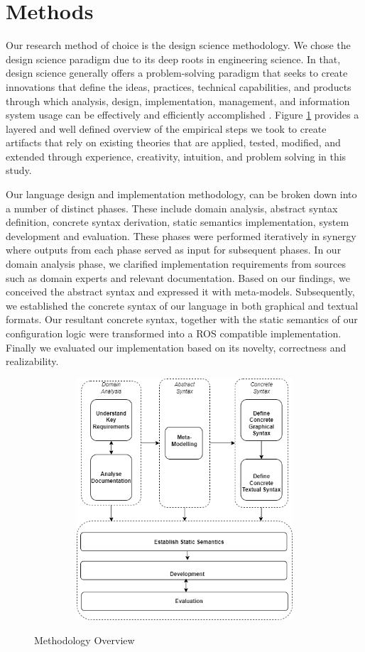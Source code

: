 \documentclass[conference]{IEEEtran}
\begin{document}
\section{Methods}
Our research method of choice is the design science methodology. We chose the design science paradigm due to its deep roots in engineering science. In that, design science generally offers a problem-solving paradigm that seeks to create innovations that define the ideas, practices, technical capabilities, and products through which analysis, design, implementation, management, and information system usage can be effectively and efficiently accomplished  \cite{des-res}. Figure \ref{methover} provides a layered and well defined overview of the empirical steps we took to create artifacts that rely on existing theories that are applied, tested, modified, and extended through experience, creativity, intuition, and problem solving in this study.

Our language design and implementation methodology, can be broken down into a number of distinct phases. These include domain analysis, abstract syntax definition, concrete syntax derivation, static semantics implementation, system development and evaluation. These phases were performed iteratively in synergy where outputs from each phase served as input for subsequent phases. In our domain analysis phase, we clarified implementation requirements from sources such as domain experts and relevant documentation. Based on our findings, we conceived the abstract syntax and expressed it with meta-models. Subsequently, we established the concrete syntax of our language in both graphical and textual formats. Our resultant concrete syntax, together with the static semantics of our configuration logic were transformed into a ROS compatible implementation. Finally we evaluated our implementation based on its novelty, correctness and realizability.

\begin{figure}[H]
\caption{Methodology Overview}
\centering
\includegraphics[keepaspectratio,height=9cm, width=12cm]{diagrams/methods.png}
\label{methover}
\end{figure}
\end{document}
